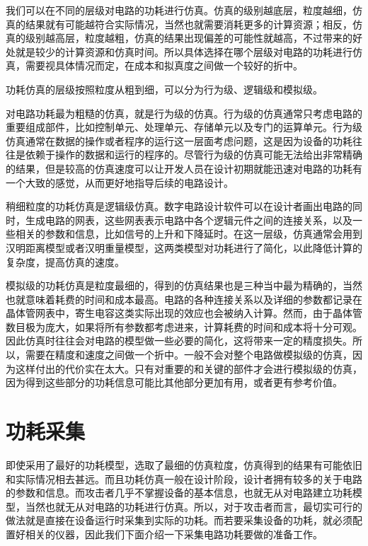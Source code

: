 我们可以在不同的层级对电路的功耗进行仿真。仿真的级别越底层，粒度越细，仿真的结果就有可能越符合实际情况，当然也就需要消耗更多的计算资源；相反，仿真的级别越高层，粒度越粗，仿真的结果出现偏差的可能性就越高，不过带来的好处就是较少的计算资源和仿真时间。所以具体选择在哪个层级对电路的功耗进行仿真，需要视具体情况而定，在成本和拟真度之间做一个较好的折中。

功耗仿真的层级按照粒度从粗到细，可以分为行为级、逻辑级和模拟级。

对电路功耗最为粗糙的仿真，就是行为级的仿真。行为级的仿真通常只考虑电路的重要组成部件，比如控制单元、处理单元、存储单元以及专门的运算单元。行为级仿真通常在数据的操作或者程序的运行这一层面考虑问题，这是因为设备的功耗往往是依赖于操作的数据和运行的程序的。尽管行为级的仿真可能无法给出非常精确的结果，但是较高的仿真速度可以让开发人员在设计初期就能迅速对电路的功耗有一个大致的感觉，从而更好地指导后续的电路设计。

稍细粒度的功耗仿真是逻辑级仿真。数字电路设计软件可以在设计者画出电路的同时，生成电路的网表，这些网表表示电路中各个逻辑元件之间的连接关系，以及一些相关的参数和信息，比如信号的上升和下降延时。在这一层级，仿真通常会用到汉明距离模型或者汉明重量模型，这两类模型对功耗进行了简化，以此降低计算的复杂度，提高仿真的速度。

模拟级的功耗仿真是粒度最细的，得到的仿真结果也是三种当中最为精确的，当然也就意味着耗费的时间和成本最高。电路的各种连接关系以及详细的参数都记录在晶体管网表中，寄生电容这类实际出现的效应也会被纳入计算。然而，由于晶体管数目极为庞大，如果将所有参数都考虑进来，计算耗费的时间和成本将十分可观。因此仿真时往往会对电路的模型做一些必要的简化，这将带来一定的精度损失。所以，需要在精度和速度之间做一个折中。一般不会对整个电路做模拟级的仿真，因为这样付出的代价实在太大。只有对重要的和关键的部件才会进行模拟级的仿真，因为得到这些部分的功耗信息可能比其他部分更加有用，或者更有参考价值。

\section{功耗采集} %
\label{sec:collect}
即使采用了最好的功耗模型，选取了最细的仿真粒度，仿真得到的结果有可能依旧和实际情况相去甚远。而且功耗仿真一般在设计阶段，设计者拥有较多的关于电路的参数和信息。而攻击者几乎不掌握设备的基本信息，也就无从对电路建立功耗模型，当然也就无从对电路的功耗进行仿真。所以，对于攻击者而言，最切实可行的做法就是直接在设备运行时采集到实际的功耗。而若要采集设备的功耗，就必须配置好相关的仪器，因此我们下面介绍一下采集电路功耗要做的准备工作。

\vspace*{\baselineskip}

